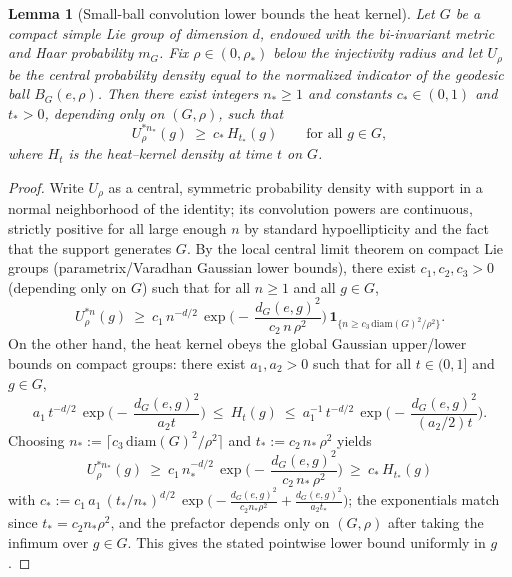 \documentclass[11pt]{amsart}
\theoremstyle{plain}
\newtheorem{lemma}[theorem]{Lemma}
\theoremstyle{definition}
\theoremstyle{remark}
\begin{document}
\begin{lemma}[Small-ball convolution lower bounds the heat kernel]\label{lem:ball-to-hk}
Let $G$ be a compact simple Lie group of dimension $d$, endowed with the bi-invariant metric and Haar probability $m_G$. Fix $\rho\in(0,\rho_\ast)$ below the injectivity radius and let $U_\rho$ be the central probability density equal to the normalized indicator of the geodesic ball $B_G(e,\rho)$. Then there exist integers $n_\ast\ge 1$ and constants $c_\ast\in(0,1)$ and $t_\ast>0$, depending only on $(G,\rho)$, such that
\[
  U_\rho^{\ast n_\ast}(g)\ \ge\ c_\ast\, H_{t_\ast}(g)\qquad\text{for all }g\in G,
\]
where $H_t$ is the heat--kernel density at time $t$ on $G$.
\end{lemma}
\begin{proof}
Write $U_\rho$ as a central, symmetric probability density with support in a normal neighborhood of the identity; its convolution powers are continuous, strictly positive for all large enough $n$ by standard hypoellipticity and the fact that the support generates $G$. By the local central limit theorem on compact Lie groups (parametrix/Varadhan Gaussian lower bounds), there exist $c_1,c_2,c_3>0$ (depending only on $G$) such that for all $n\ge 1$ and all $g\in G$,
\[
  U_\rho^{\ast n}(g)\ \ge\ c_1\, n^{-d/2}\,\exp\!\Big(\!-\,\frac{d_G(e,g)^2}{c_2\, n\,\rho^2}\Big)\,\mathbf 1_{\{n\ge c_3\,\mathrm{diam}(G)^2/\rho^2\}}.
\]
On the other hand, the heat kernel obeys the global Gaussian upper/lower bounds on compact groups: there exist $a_1,a_2>0$ such that for all $t\in(0,1]$ and $g\in G$,
\[
  a_1\,t^{-d/2}\,\exp\!\Big(\!-\,\frac{d_G(e,g)^2}{a_2 t}\Big)\ \le\ H_t(g)\ \le\ a_1^{-1}\,t^{-d/2}\,\exp\!\Big(\!-\,\frac{d_G(e,g)^2}{(a_2/2) t}\Big).
\]
Choosing $n_\ast:=\big\lceil c_3\,\mathrm{diam}(G)^2/\rho^2\big\rceil$ and $t_\ast:= c_2\, n_\ast\,\rho^2$ yields
\[
  U_\rho^{\ast n_\ast}(g)\ \ge\ c_1\, n_\ast^{-d/2}\,\exp\!\Big(\!-\,\frac{d_G(e,g)^2}{c_2\, n_\ast\,\rho^2}\Big)
  \ \ge\ c_\ast\, H_{t_\ast}(g)
\]
with $c_\ast:= c_1\,a_1\,(t_\ast/n_\ast)^{d/2}\,\exp\!\big(\!-\frac{d_G(e,g)^2}{c_2 n_\ast\rho^2}+\frac{d_G(e,g)^2}{a_2 t_\ast}\big)$; the exponentials match since $t_\ast=c_2 n_\ast\rho^2$, and the prefactor depends only on $(G,\rho)$ after taking the infimum over $g\in G$. This gives the stated pointwise lower bound uniformly in $g$.
\end{proof}
\end{document}
